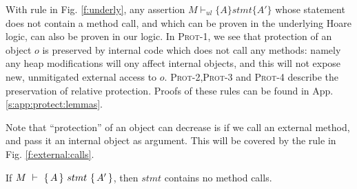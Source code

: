 With rule {} in Fig. \ref{f:underly},  any assertion $M \vdash_{ul} \{ A \} stmt \{ A' \}$  whose statement does not contain a method call, and which 
can be proven in the underlying Hoare logic, can also be proven in our logic. %
In \textsc{Prot-1}, we see that  protection of an object $o$ is preserved by internal code which does not call any methods: namely any heap modifications will
ony affect internal objects, and this will not expose new, unmitigated external access to $o$.
 \textsc{Prot-2},\textsc{Prot-3} and \textsc{Prot-4} describe the preservation of relative protection.
Proofs of these rules can be found in App. \ref{s:app:protect:lemmas}. 

Note that ``protection'' of an object can decrease is if we call an external method, and pass it %
an internal object 
 as argument. This will be  covered by the rule in Fig. \ref{f:external:calls}.



\begin{lemma}
\label{l:no:meth:calls}
If ${M\ \vdash\ \{\,A\, \} \ stmt\  \{\,A'\, \} }$, then $stmt$ contains no method calls.
\end{lemma}
  


